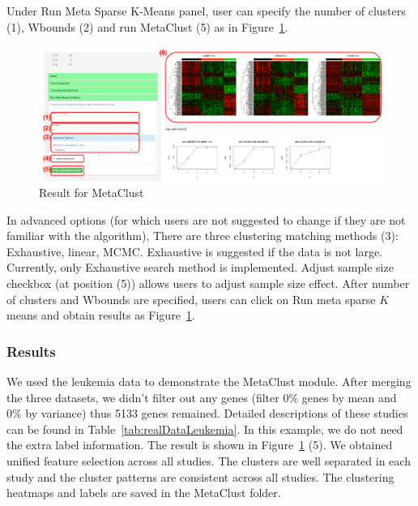 \begin{steps}
Under Run Meta Sparse K-Means panel,
user can specify the number of clusters {\color{red} (1)}, Wbounds {\color{red} (2)} and run MetaClust {\color{red} (5)} 
as in Figure~\ref{fig:mskmRes}.
\begin{figure}[H]
\begin{center}
\includegraphics[scale=0.5]{./figure/metaClust/mskmRes.pdf}
\caption{Result for MetaClust}
\label{fig:mskmRes}
\end{center}
\end{figure}
In advanced options (for which users are not suggested to change if they are not familiar with the algorithm), 
There are three clustering matching methods {\color{red} (3)}: Exhaustive, linear, MCMC.
Exhaustive is suggested if the data is not large.
Currently, only Exhaustive search method is implemented.
Adjust sample size checkbox (at position {\color{red} (5)}) allows users to adjust sample size effect.
After number of clusters and Wbounds are specified,
users can click on Run meta sparse $K$ means and obtain results as Figure~\ref{fig:mskmRes}.
\end{steps}


\subsubsection{Results}

We used the leukemia data to demonstrate the MetaClust module.
After merging the three datasets, we didn't filter out any genes (filter 0\% genes by mean and 0\% by variance) thus 5133 genes remained.
Detailed descriptions of these studies can be found in Table~\ref{tab:realDataLeukemia}. 
In this example, we do not need the extra label information.
The result is shown in Figure~\ref{fig:mskmRes} {\color{red} (5)}.
We obtained unified feature selection across all studies.
The clusters are well separated in each study and the cluster patterns are consistent across all studies.
The clustering heatmaps and labels are saved in the MetaClust folder.










